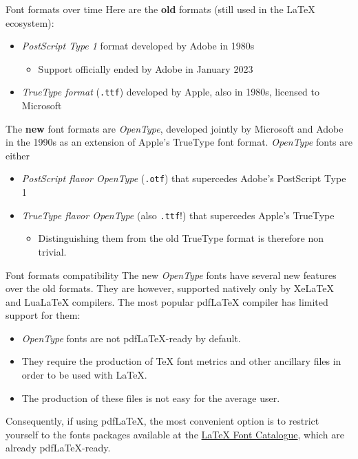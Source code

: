 \documentclass{beamer}
\newcommand{\hrefcol}[2]{\textcolor{uihteal}{\href{#1}{#2}}}
\begin{document}
\begin{frame}[fragile]{Font formats over time}
Here are the \textbf{old} formats (still used in the LaTeX ecosystem):

\begin{itemize}
\item \emph{PostScript Type 1} format developed by Adobe in 1980s
\begin{itemize}
    \item Support officially ended by Adobe in January 2023
\end{itemize}
\item \emph{TrueType format} (\verb|.ttf|) developed by Apple, also in 1980s, licensed to Microsoft
\end{itemize}

The \textbf{new} font formats are \emph{OpenType}, developed jointly by Microsoft and Adobe in the 1990s as an extension of Apple's TrueType font format. \emph{OpenType} fonts are either

\begin{itemize}
\item \emph{PostScript flavor OpenType} (\verb|.otf|) that supercedes Adobe's PostScript Type 1
\item \emph{TrueType flavor OpenType} (also \verb|.ttf|!) that supercedes Apple's TrueType
    \begin{itemize}
    \item Distinguishing them from the old TrueType format is therefore non trivial.
    \end{itemize}
\end{itemize}
\end{frame}


\begin{frame}[fragile]{Font formats compatibility}
The new \emph{OpenType} fonts have several new features over the old formats. They are however, supported natively only by XeLaTeX and LuaLaTeX compilers. The most popular pdfLaTeX compiler has limited support for them:
\begin{itemize}
\item \emph{OpenType} fonts are not pdfLaTeX-ready by default.
\item They require the production of TeX font metrics and other ancillary files in order to be used with LaTeX.
\item The production of these files is not easy for the average user.
\end{itemize}
Consequently, if using pdfLaTeX, the most convenient option is to restrict yourself to the fonts packages available at the \hrefcol{https://tug.org/FontCatalogue/}{LaTeX Font Catalogue}, which are already pdfLaTeX-ready.
\end{frame}
\end{document}
